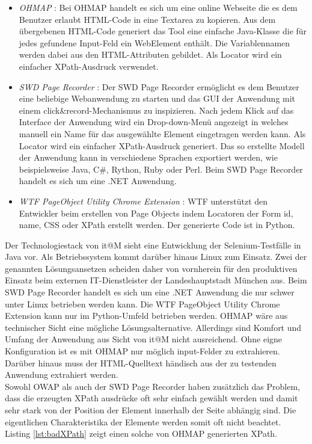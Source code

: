 \begin{itemize}
\item \textit{OHMAP} \cite{virtuetech_gmbh_ohmap_2015}: Bei OHMAP handelt es sich um eine online Webseite die es dem Benutzer erlaubt HTML-Code in eine Textarea zu kopieren. Aus dem übergebenen HTML-Code generiert das Tool eine einfache Java-Klasse die für jedes gefundene Input-Feld ein WebElement enthält. Die Variablennamen werden dabei aus den HTML-Attributen gebildet. Als Locator wird ein einfacher XPath-Ausdruck verwendet.
	
\item \textit{SWD Page Recorder} \cite{dmytro_zharii_dzharii/swd-recorder_2015}: Der SWD Page Recorder ermöglicht es dem Benutzer eine beliebige Webanwendung zu starten und das GUI der Anwendung mit einem click\&record-Mechanismus zu inspizieren.
Nach jedem Klick auf das Interface der Anwendung wird ein Drop-down-Menü angezeigt in welches manuell ein Name für das ausgewählte Element eingetragen werden kann. Als Locator wird ein einfacher XPath-Ausdruck generiert.
Das so erstellte Modell der Anwendung kann in verschiedene Sprachen exportiert werden, wie beispielsweise Java, C\#, Rython, Ruby oder Perl. Beim SWD Page Recorder handelt es sich um eine .NET Anwendung.

\item\textit{ WTF PageObject Utility Chrome Extension} \cite{daniel_wiredrive/wtframework_2015}: WTF unterstützt den Entwickler beim erstellen von Page Objects indem Locatoren der Form id, name, CSS oder XPath erstellt werden. Der generierte Code ist in Python.
	
\end{itemize}

Der Technologiestack von it@M sieht eine Entwicklung der Selenium-Testfälle in Java vor. Als Betriebssystem kommt darüber hinaus Linux zum Einsatz.
Zwei der genannten Lösungsansetzen scheiden daher von vornherein für den produktiven Einsatz beim externen IT-Dienstleister der Landeshauptstadt München aus. Beim SWD Page Recorder handelt es sich um eine .NET Anwendung die nur schwer unter Linux betrieben werden kann. Die WTF PageObject Utility Chrome Extension kann nur im Python-Umfeld betrieben werden. OHMAP wäre aus technischer Sicht eine mögliche Lösungsalternative. Allerdings sind Komfort und Umfang der Anwendung aus Sicht von it@M nicht ausreichend. Ohne eigne Konfiguration ist es mit OHMAP nur möglich input-Felder zu extrahieren.
Darüber hinaus muss der HTML-Quelltext händisch aus der zu testenden Anwendung extrahiert werden. \\
Sowohl OWAP als auch der SWD Page Recorder haben zusätzlich das Problem, dass die erzeugten XPath ausdrücke oft sehr einfach gewählt werden und damit sehr stark von der Position der Element innerhalb der Seite abhängig sind. Die eigentlichen Charakteristika der Elemente werden somit oft nicht beachtet. Listing \ref{lst:badXPath}
zeigt einen solche von OHMAP generierten XPath.

